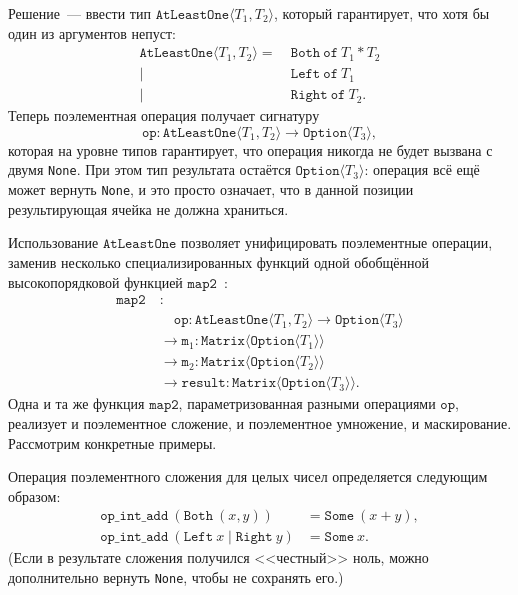 Решение~--- ввести тип $\texttt{AtLeastOne}\langle T_1, T_2\rangle$, который гарантирует, что хотя бы один из аргументов непуст:
\begin{align*}
    \texttt{AtLeastOne}\langle T_1, T_2\rangle =\ &\texttt{Both}\ \texttt{of}\ T_1 * T_2 \\
    \mid\ &\texttt{Left}\ \texttt{of}\ T_1 \\
    \mid\ &\texttt{Right}\ \texttt{of}\ T_2.
\end{align*}
Теперь поэлементная операция получает сигнатуру
\[
    \texttt{op}: \texttt{AtLeastOne}\langle T_1, T_2\rangle \to \texttt{Option}\langle T_3\rangle,
\]
которая на уровне типов гарантирует, что операция никогда не будет вызвана с двумя \texttt{None}.
При этом тип результата остаётся $\texttt{Option}\langle T_3\rangle$: операция всё ещё может вернуть \texttt{None}, и это просто означает, что в данной позиции результирующая ячейка не должна храниться.

Использование $\texttt{AtLeastOne}$ позволяет унифицировать поэлементные операции, заменив несколько специализированных функций одной обобщённой высокопорядковой функцией $\texttt{map2}$~:
\begin{align*}
    \texttt{map2}\ & : \\
    & \quad \texttt{op}: \texttt{AtLeastOne}\langle T_1, T_2\rangle \to \texttt{Option}\langle T_3\rangle \\
    & \to \texttt{m}_1: \texttt{Matrix}\langle\texttt{Option}\langle T_1\rangle\rangle \\
    & \to \texttt{m}_2: \texttt{Matrix}\langle\texttt{Option}\langle T_2\rangle\rangle \\
    & \to \texttt{result}: \texttt{Matrix}\langle\texttt{Option}\langle T_3\rangle\rangle.
\end{align*}
Одна и та же функция $\texttt{map2}$, параметризованная разными операциями $\texttt{op}$, реализует и поэлементное сложение, и поэлементное умножение, и маскирование.
Рассмотрим конкретные примеры.

Операция поэлементного сложения для целых чисел определяется следующим образом:
\begin{align*}
    \texttt{op\_int\_add}\ (\texttt{Both}\ (x, y)) &= \texttt{Some}\ (x + y), \\
    \texttt{op\_int\_add}\ (\texttt{Left}\ x \mid \texttt{Right}\ y) &= \texttt{Some}\ x.
\end{align*}
(Если в результате сложения получился <<честный>> ноль, можно дополнительно вернуть \texttt{None}, чтобы не сохранять его.)

